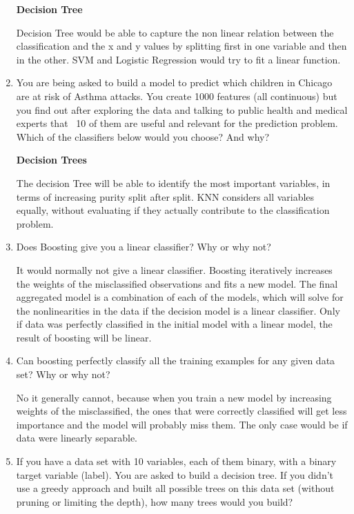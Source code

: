 \documentclass[a4paper, 11pt]{article}
\begin{document}
\begin{enumerate}
\textbf{Decision Tree}

Decision Tree would be able to capture the non linear relation between the classification and the x and y values by splitting first in one variable and then in the other. SVM and Logistic Regression would try to fit a linear function.

\item You are being asked to build a model to predict which children in Chicago are at risk of Asthma attacks. You create 1000 features (all continuous) but you find out after exploring the data and talking to public health and medical experts that ~10 of them are useful and relevant for the prediction problem. Which of the classifiers below would you choose? And why?

\textbf{Decision Trees}

The decision Tree will be able to identify the most important variables, in terms of increasing purity split after split. KNN considers all variables equally, without evaluating if they actually contribute to the classification problem. 


\item Does Boosting give you a linear classifier? Why or why not?

It would normally not give a linear classifier. Boosting iteratively increases the weights of the misclassified observations and fits a new model. The final aggregated model is a combination of each of the models, which will solve for the nonlinearities in the data if the decision model is a linear classifier. Only if data was perfectly classified in the initial model with a linear model, the result of boosting will be linear.

\item Can boosting perfectly classify all the training examples for any given data set? Why or why not?

No it generally cannot, because when you train a new model by increasing weights of the misclassified, the ones that were correctly classified will get less importance and the model will probably miss them. The only case would be if data were linearly separable. 

\item If you have a data set with 10 variables, each of them binary, with a binary target variable (label). You are asked to build a decision tree. If you didn’t use a greedy approach and built all possible trees on this data set (without pruning or limiting the depth), how many trees would you build?


\end{enumerate}
\end{document}
